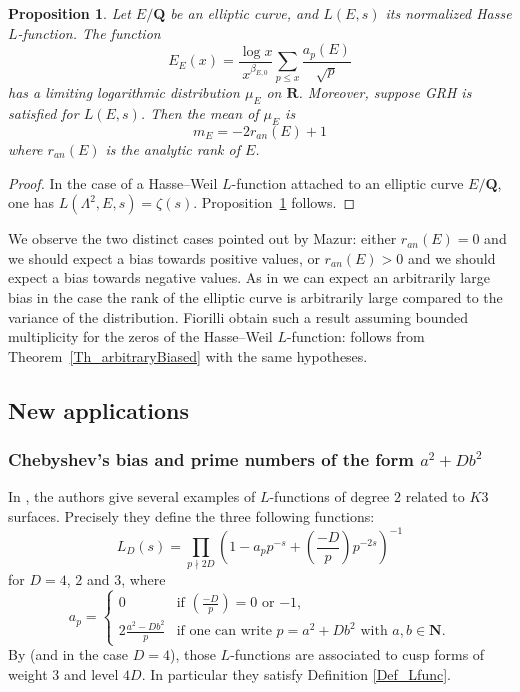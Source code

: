 \documentclass[a4paper,10pt]{amsart}
\theoremstyle{plain}
\newtheorem{prop}[theo]{Proposition}
\theoremstyle{definition}
\begin{document}
\begin{prop}\label{Prop_Fi_EC}
Let $E/\mathbf{Q}$ be an elliptic curve, and $L(E,s)$ its normalized Hasse $L$-function.
The function 
$$E_{E}(x) = \frac{\log x}{x^{\beta_{E,0}}}\sum_{p\leq x}\frac{a_{p}(E)}{\sqrt{p}}$$
has a limiting logarithmic distribution $\mu_{E}$ on $\mathbf{R}$.
Moreover, suppose GRH is satisfied for $L(E,s)$.
Then the mean of $\mu_{E}$ is 
$$m_{E} = -2r_{an}(E) + 1$$
where $r_{an}(E)$ is the analytic rank of $E$.
\end{prop}

\begin{proof}
In the case of a Hasse--Weil $L$-function attached to an elliptic curve $E/\mathbf{Q}$, 
one has $L(\Lambda^{2}, E, s)=\zeta(s)$.
Proposition~\ref{Prop_Fi_EC} follows.
\end{proof}

We observe the two distinct cases pointed out by Mazur:
either $r_{an}(E) = 0$ and we should expect a bias towards positive values,
or $r_{an}(E) >0$ and we should expect a bias towards negative values.
As in \cite{FioEC} we can expect an arbitrarily large bias in the case the rank of the elliptic curve is arbitrarily large compared to the variance of the distribution.
Fiorilli obtain such a result assuming bounded multiplicity for the zeros of the Hasse--Weil $L$-function:
\cite[Th. 1.2]{FioEC} follows from Theorem~\ref{Th_arbitraryBiased} with the same hypotheses.

\subsection{New applications}

\subsubsection{Chebyshev's bias and prime numbers of the form $a^{2} + D b^{2}$}

In \cite{BS}, the authors give several examples of $L$-functions of degree $2$ related to $K3$ surfaces.
Precisely they define the three following functions:
$$L_{D}(s) = \prod_{p\nmid 2D}\left(1-a_{p}p^{-s} + \left(\frac{-D}{p}\right)p^{-2s}\right)^{-1}$$
for $D= 4$, $2$ and $3$,
where
$$a_{p} =\left\lbrace
\begin{array}{ll}
0 & \mbox{if $\left(\frac{-D}{p}\right)=0$ or $-1$,}\\
2\frac{a^{2} - Db^{2}}{p} & \mbox{if one can write $p= a^{2} + Db^{2}$ with $a,b\in \mathbf{N}$.}
\end{array}
\right.$$
By \cite[Th. 14.2]{BS} (and \cite{Schoeneberg} in the case $D=4$), those $L$-functions are associated to cusp forms of weight $3$ and level $4D$.
In particular they satisfy Definition \ref{Def_Lfunc}.
\end{document}
